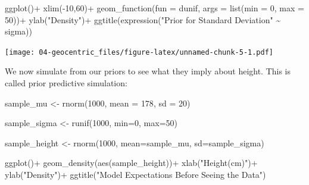 \documentclass[
]{book}
\newenvironment{Shaded}{\begin{snugshade}}{\end{snugshade}}
\newcommand{\AttributeTok}[1]{\textcolor[rgb]{0.77,0.63,0.00}{#1}}
\newcommand{\DecValTok}[1]{\textcolor[rgb]{0.00,0.00,0.81}{#1}}
\newcommand{\FunctionTok}[1]{\textcolor[rgb]{0.00,0.00,0.00}{#1}}
\newcommand{\NormalTok}[1]{#1}
\newcommand{\OtherTok}[1]{\textcolor[rgb]{0.56,0.35,0.01}{#1}}
\newcommand{\SpecialCharTok}[1]{\textcolor[rgb]{0.00,0.00,0.00}{#1}}
\newcommand{\StringTok}[1]{\textcolor[rgb]{0.31,0.60,0.02}{#1}}
\begin{document}
\begin{Shaded}
\begin{Highlighting}[]
\FunctionTok{ggplot}\NormalTok{()}\SpecialCharTok{+}
  \FunctionTok{xlim}\NormalTok{(}\SpecialCharTok{{-}}\DecValTok{10}\NormalTok{,}\DecValTok{60}\NormalTok{)}\SpecialCharTok{+}
  \FunctionTok{geom\_function}\NormalTok{(}\AttributeTok{fun =}\NormalTok{ dunif, }\AttributeTok{args =} \FunctionTok{list}\NormalTok{(}\AttributeTok{min =} \DecValTok{0}\NormalTok{, }\AttributeTok{max =} \DecValTok{50}\NormalTok{))}\SpecialCharTok{+}
  \FunctionTok{ylab}\NormalTok{(}\StringTok{"Density"}\NormalTok{)}\SpecialCharTok{+}
  \FunctionTok{ggtitle}\NormalTok{(}\FunctionTok{expression}\NormalTok{(}\StringTok{"Prior for Standard Deviation"} \SpecialCharTok{\textasciitilde{}}\NormalTok{ sigma))}
\end{Highlighting}
\end{Shaded}

\texttt{[image: 04-geocentric\_files/figure-latex/unnamed-chunk-5-1.pdf]}

We now simulate from our priors to see what they imply about height. This is called prior predictive simulation:

\begin{Shaded}
\begin{Highlighting}[]
\NormalTok{sample\_mu }\OtherTok{\textless{}{-}} \FunctionTok{rnorm}\NormalTok{(}\DecValTok{1000}\NormalTok{, }\AttributeTok{mean =} \DecValTok{178}\NormalTok{, }\AttributeTok{sd =} \DecValTok{20}\NormalTok{)}

\NormalTok{sample\_sigma }\OtherTok{\textless{}{-}} \FunctionTok{runif}\NormalTok{(}\DecValTok{1000}\NormalTok{, }\AttributeTok{min=}\DecValTok{0}\NormalTok{, }\AttributeTok{max=}\DecValTok{50}\NormalTok{)  }
  
\NormalTok{sample\_height }\OtherTok{\textless{}{-}} \FunctionTok{rnorm}\NormalTok{(}\DecValTok{1000}\NormalTok{, }\AttributeTok{mean=}\NormalTok{sample\_mu, }\AttributeTok{sd=}\NormalTok{sample\_sigma)}

\FunctionTok{ggplot}\NormalTok{()}\SpecialCharTok{+}
  \FunctionTok{geom\_density}\NormalTok{(}\FunctionTok{aes}\NormalTok{(sample\_height))}\SpecialCharTok{+}
  \FunctionTok{xlab}\NormalTok{(}\StringTok{"Height(cm)"}\NormalTok{)}\SpecialCharTok{+}
  \FunctionTok{ylab}\NormalTok{(}\StringTok{"Density"}\NormalTok{)}\SpecialCharTok{+}
  \FunctionTok{ggtitle}\NormalTok{(}\StringTok{"Model Expectations Before Seeing the Data"}\NormalTok{)}
\end{Highlighting}
\end{Shaded}
\end{document}
